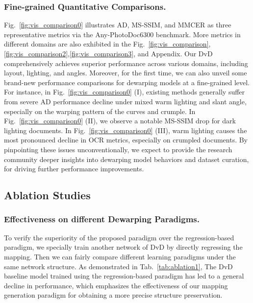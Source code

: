 \subsubsection{Fine-grained Quantitative Comparisons.}
Fig.~\ref{fig:vis_comparison0} illustrates AD, MS‑SSIM, and MMCER as three representative metrics via the Any-PhotoDoc6300 benchmark. More metrics in different domains are also exhibited in the Fig.~\ref{fig:vis_comparison},\ref{fig:vis_comparison2},\ref{fig:vis_comparison3}, and Appendix. Our DvD comprehensively achieves superior performance across various domains, including layout, lighting, and angles. Moreover, for the first time, we can also unveil some brand-new performance comparisons for dewarping models at a fine-grained level. For instance, in Fig.~\ref{fig:vis_comparison0} (I), existing methods generally suffer from severe AD performance decline under mixed warm lighting and slant angle, especially on the warping pattern of the curves and crumple.
In Fig.~\ref{fig:vis_comparison0} (II), we observe a notable MS-SSIM drop for dark lighting documents.
In Fig.~\ref{fig:vis_comparison0} (III), warm lighting causes the most pronounced decline in OCR metrics, especially on crumpled documents.
By pinpointing these issues unconventionally, we expect to provide the research community deeper insights into dewarping model behaviors and dataset curation, for driving further performance improvements.




\subsection{Ablation Studies}
\subsubsection{Effectiveness on different Dewarping Paradigms.}
To verify the superiority of the proposed paradigm over the regression-based paradigm, we specially train another network of DvD by directly regressing the mapping. Then we can fairly compare different learning paradigms under the same network structure. As demonstrated in Tab.~\ref{tab:ablation1}, The DvD baseline model trained using the regression-based paradigm has led to a general decline in performance, which emphasizes the effectiveness of our mapping generation paradigm for obtaining a more precise structure preservation.

